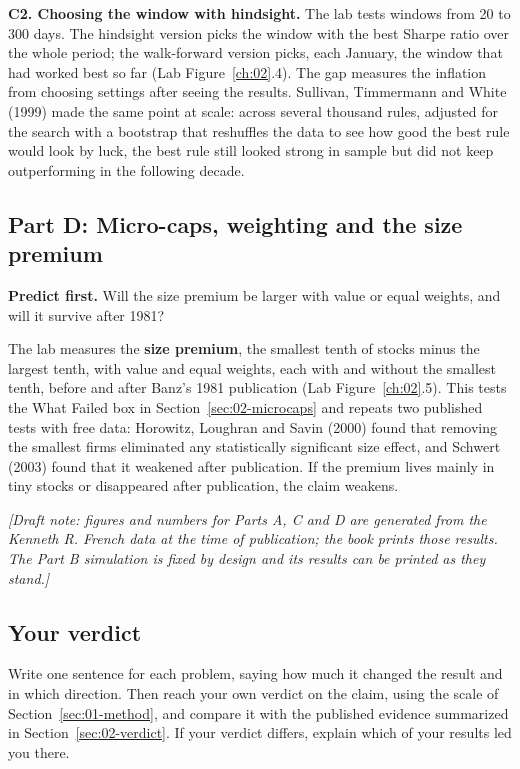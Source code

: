 \textbf{C2. Choosing the window with hindsight.} The lab tests windows from 20 to 300 days. The hindsight version picks the window with the best Sharpe ratio over the whole period; the walk-forward version picks, each January, the window that had worked best so far (Lab Figure~\ref{ch:02}.4). The gap measures the inflation from choosing settings after seeing the results. Sullivan, Timmermann and White (1999) made the same point at scale: across several thousand rules, adjusted for the search with a bootstrap that reshuffles the data to see how good the best rule would look by luck, the best rule still looked strong in sample but did not keep outperforming in the following decade.

\subsection*{Part D: Micro-caps, weighting and the size premium}

\textbf{Predict first.} Will the size premium be larger with value or equal weights, and will it survive after 1981?

The lab measures the \textbf{size premium}, the smallest tenth of stocks minus the largest tenth, with value and equal weights, each with and without the smallest tenth, before and after Banz's 1981 publication (Lab Figure~\ref{ch:02}.5). This tests the What Failed box in Section~\ref{sec:02-microcaps} and repeats two published tests with free data: Horowitz, Loughran and Savin (2000) found that removing the smallest firms eliminated any statistically significant size effect, and Schwert (2003) found that it weakened after publication. If the premium lives mainly in tiny stocks or disappeared after publication, the claim weakens.

\emph{[Draft note: figures and numbers for Parts A, C and D are generated from the Kenneth R. French data at the time of publication; the book prints those results. The Part B simulation is fixed by design and its results can be printed as they stand.]}

\subsection*{Your verdict}

Write one sentence for each problem, saying how much it changed the result and in which direction. Then reach your own verdict on the claim, using the scale of Section~\ref{sec:01-method}, and compare it with the published evidence summarized in Section~\ref{sec:02-verdict}. If your verdict differs, explain which of your results led you there.

